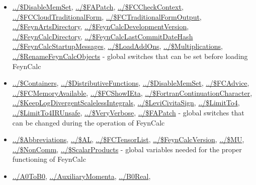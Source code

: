 \documentclass[../FeynCalcManual.tex]{subfiles}
\begin{document}
\begin{itemize}
\tightlist
\item
  \hyperlink{../dollardisablememset}{../\$DisableMemSet},
  \hyperlink{../dollarfapatch}{../\$FAPatch},
  \hyperlink{../dollarfccheckcontext}{../\$FCCheckContext},
  \hyperlink{../dollarfccloudtraditionalform}{../\$FCCloudTraditionalForm},
  \hyperlink{../dollarfctraditionalformoutput}{../\$FCTraditionalFormOutput},
  \hyperlink{../dollarfeynartsdirectory}{../\$FeynArtsDirectory},
  \hyperlink{../dollarfeyncalcdevelopmentversion}{../\$FeynCalcDevelopmentVersion},
  \hyperlink{../dollarfeyncalcdirectory}{../\$FeynCalcDirectory},
  \hyperlink{../dollarfeyncalclastcommitdatehash}{../\$FeynCalcLastCommitDateHash}
  \hyperlink{../dollarfeyncalcstartupmessages}{../\$FeynCalcStartupMessages},
  \hyperlink{../dollarloadaddons}{../\$LoadAddOns},
  \hyperlink{../dollarmultiplications}{../\$Multiplications},
  \hyperlink{../dollarrenamefeyncalcobjects}{../\$RenameFeynCalcObjects}
  - global switches that can be set before loading FeynCalc
\item
  \hyperlink{../dollarcontainers}{../\$Containers},
  \hyperlink{../dollardistributivefunctions}{../\$DistributiveFunctions},
  \hyperlink{../dollardisablememset}{../\$DisableMemSet},
  \hyperlink{../dollarfcadvice}{../\$FCAdvice},
  \hyperlink{../dollarfcmemoryavailable}{../\$FCMemoryAvailable},
  \hyperlink{../dollarfcshowieta}{../\$FCShowIEta},
  \hyperlink{../dollarfortrancontinuationcharacter}{../\$FortranContinuationCharacter},
  \hyperlink{../dollarkeeplogdivergentscalelessintegrals}{../\$KeepLogDivergentScalelessIntegrals},
  \hyperlink{../dollarlevicivitasign}{../\$LeviCivitaSign},
  \hyperlink{../dollarlimitto4}{../\$LimitTo4},
  \hyperlink{../dollarlimitto4irunsafe}{../\$LimitTo4IRUnsafe},
  \hyperlink{../dollarveryverbose}{../\$VeryVerbose},
  \hyperlink{../dollarfapatch}{../\$FAPatch} - global switches that can
  be changed during the operation of FeynCalc
\item
  \hyperlink{../dollarabbreviations}{../\$Abbreviations},
  \hyperlink{../dollaral}{../\$AL},
  \hyperlink{../dollarfctensorlist}{../\$FCTensorList},
  \hyperlink{../dollarfeyncalcversion}{../\$FeynCalcVersion},
  \hyperlink{../dollarmu}{../\$MU},
  \hyperlink{../dollarnoncomm}{../\$NonComm},
  \hyperlink{../dollarscalarproducts}{../\$ScalarProducts} - global
  variables needed for the proper functioning of FeynCalc
\item
  \hyperlink{../a0tob0}{../A0ToB0},
  \hyperlink{../auxiliarymomenta}{../AuxiliaryMomenta},
  \hyperlink{../b0real}{../B0Real},

\end{itemize}
\end{document}
